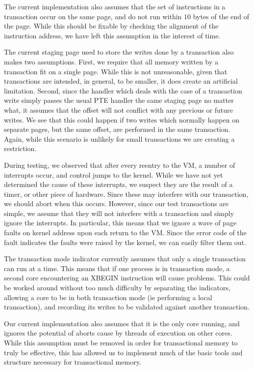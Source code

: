 \documentclass{acm_proc_article-sp}
\begin{document}
The current implementation also assumes that the set of instructions in a 
transaction occur on the same page, and do not run within $10$ bytes of the
end of the page. While this should be fixable by checking the alignment of
the instruction address, we have left this assumption in the interest of 
time. 

The current staging page used to store the writes done by a transaction also
makes two assumptions. First, we require that all memory written by a 
transaction fit on a single page. While this is not unreasonable, given that
transactions are intended, in general, to be smaller, it does create an
artificial limitation. Second, since the handler which deals with the case
of a transaction write simply passes the usual PTE handler the same staging
page no matter what, it assumes that the offset will not conflict with any
previous or future writes. We see that this could happen if two writes which
normally happen on separate pages, but the same offset, are performed in the
same transaction. Again, while this scenario is unlikely for small transactions
we are creating a restriction.
 
During testing, we observed that after every reentry to the VM, a number
of interrupts occur, and control jumps to the kernel. While we have not yet
determined the cause of these interrupts, we suspect they are the result of 
a timer, or other piece of hardware. Since these may interfere with our 
transaction, we should abort when this occurs. However, since our test 
transactions are simple, we assume that they will not interfere with a 
transaction and simply ignore the interrupts. In particular, this means that
we ignore a wave of page faults on kernel address upon each return to the
VM. Since the error code of the fault indicates the faults were raised by
the kernel, we can easily filter them out.   

The transaction mode indicator currently assumes that only a single
transaction can run at a time. This means that if one process is in transaction
mode, a second core encountering an XBEGIN instruction will cause problems.
This could be worked around without too much difficulty by separating the
indicators, allowing a core to be in both transaction mode (ie performing
a local transaction), and recording its writes to be validated against
another transaction.

Our current implementation also assumes that it is the only core running, and
ignores the potential of aborts cause by threads of execution on other cores.
While this assumption must be removed in order for transactional memory to
truly be effective, this has allowed us to implement much of the basic tools
and structure necessary for transactional memory.
 
\end{document}
